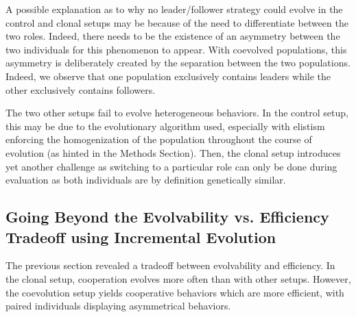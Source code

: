   A possible explanation as to why no leader/follower strategy could evolve in the control and clonal setups may be because of the need to differentiate between the two roles. Indeed, there needs to be the existence of an asymmetry between the two individuals for this phenomenon to appear. With coevolved populations, this asymmetry is deliberately created by the separation between the two populations. Indeed, we observe that one population exclusively contains leaders while the other exclusively contains followers. 

  The two other setups fail to evolve heterogeneous behaviors. In the control setup, this may be due to the evolutionary algorithm used, especially with elistism enforcing the homogenization of the population throughout the course of evolution (as hinted in the Methods Section). Then, the clonal setup introduces yet another challenge as switching to a particular role can only be done during evaluation as both individuals are by definition genetically similar.

  \begin{table}[hbtp]
    \caption{Repartition of the different strategies evolved in each of the runs where cooperation evolved for each setup in the foraging task. We indicate in each cell the number of simulations where a particular strategy evolved.}
    \label{tab:ForagingBehaviors}
  \end{table}

  \subsection{Going Beyond the Evolvability vs. Efficiency Tradeoff using Incremental Evolution}

  The previous section revealed a tradeoff between evolvability and efficiency. In the clonal setup, cooperation evolves more often than with other setups. However, the coevolution setup yields cooperative behaviors which are more efficient, with paired individuals displaying asymmetrical behaviors.

